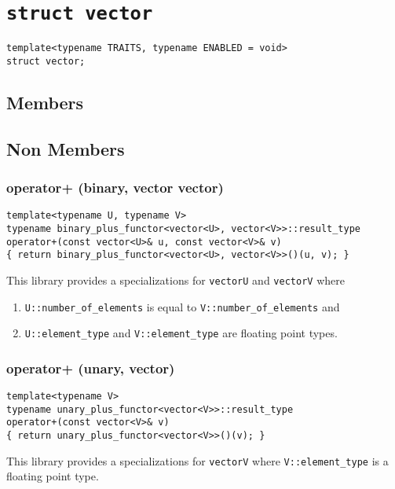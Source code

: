 \documentclass[oneside]{book}
\begin{document}
\section{\texttt{struct vector}}
\begin{verbatim}
template<typename TRAITS, typename ENABLED = void>
struct vector;
\end{verbatim}

\subsection{Members}

\subsection{Non Members}
\subsubsection{operator+ (binary, vector vector)}
\begin{verbatim}
template<typename U, typename V>
typename binary_plus_functor<vector<U>, vector<V>>::result_type
operator+(const vector<U>& u, const vector<V>& v)
{ return binary_plus_functor<vector<U>, vector<V>>()(u, v); }
\end{verbatim}
This library provides a specializations for \texttt{vector\textlangle U\textrangle}
and \texttt{vector\textlangle V\textrangle} where
\begin{enumerate}
	\item \texttt{U::number\_of\_elements} is equal to \texttt{V::number\_of\_elements} and
	\item \texttt{U::element\_type} and \texttt{V::element\_type} are floating point types.
\end{enumerate}

\subsubsection{operator+ (unary, vector)}
\begin{verbatim}
template<typename V>
typename unary_plus_functor<vector<V>>::result_type
operator+(const vector<V>& v)
{ return unary_plus_functor<vector<V>>()(v); }
\end{verbatim}
This library provides a specializations for \texttt{vector\textlangle V\textrangle}
where \texttt{V::element\_type} is a floating point type.
\end{document}
